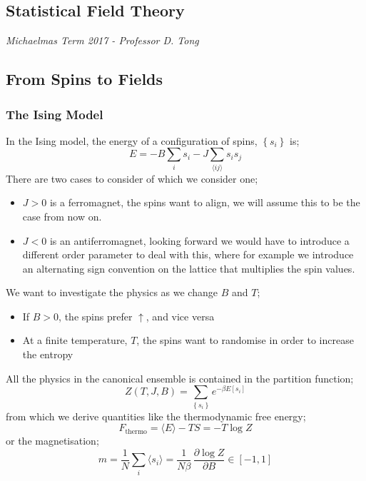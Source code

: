\label{sft}
\begin{chapterbox}
\vspace{-60pt}
\chapter{Statistical Field Theory}
\vspace{-30pt}
\centering\normalsize\textit{Michaelmas Term 2017 - Professor D. Tong}
\end{chapterbox}
\vspace{20pt}
\minitoc
\newpage
\section{From Spins to Fields}
\subsection{The Ising Model}
In the Ising model, the energy of a configuration of spins, $\left\{ s_{i} \right\}$ is;
\begin{equation}
E = -B \sum_{i}{s_i} - J \sum_{\langle ij \rangle}{s_i s_j}
\end{equation}
There are two cases to consider of which we consider one;
\begin{itemize}
\item $J > 0$ is a ferromagnet, the spins want to align, we will assume this to be the case from now on.
\item $J < 0$ is an antiferromagnet, looking forward we would have to introduce a different order parameter to deal with this, where for example we introduce an alternating sign convention on the lattice that multiplies the spin values.
\end{itemize}
We want to investigate the physics as we change $B$ and $T$;
\begin{itemize}
\item If $B > 0$, the spins prefer $\uparrow$, and vice versa
\item At a finite temperature, $T$, the spins want to randomise in order to increase the entropy
\end{itemize}
All the physics in the canonical ensemble is contained in the partition function;
\begin{equation}
Z(T, J, B) = \sum_{\left\{ s_i \right\}}{e^{-\beta E\left[ s_i \right]}}
\end{equation}
from which we derive quantities like the thermodynamic free energy;
\begin{equation}
F_{\textrm{thermo}} = \langle E \rangle - TS = -T \log Z
\end{equation}
or the magnetisation;
\begin{equation}
m = \frac{1}{N} \sum_{i}{\langle s_i \rangle} = \frac{1}{N \beta} \, \frac{\partial \log Z}{\partial B} \in \left[ -1, 1 \right]
\end{equation}
